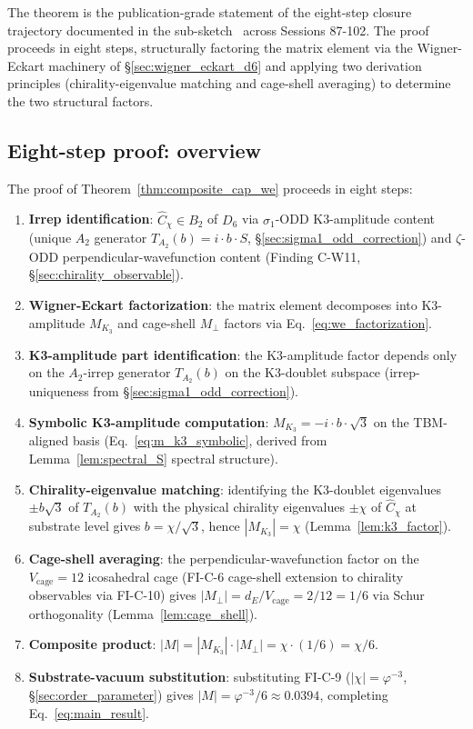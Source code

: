 \documentclass[11pt,letterpaper]{article}
\newcommand{\phig}{\varphi}
\newcommand{\Kthree}{\ensuremath{K_3}}
\newcommand{\Cchi}{\hat{C}_\chi}
\newcommand{\Dsix}{D_6}
\begin{document}
The theorem is the publication-grade statement of the eight-step closure trajectory documented in the sub-sketch~\cite{abshier_capotauro_subclaim_c_sketch} across Sessions 87-102. The proof proceeds in eight steps, structurally factoring the matrix element via the Wigner-Eckart machinery of \S\ref{sec:wigner_eckart_d6} and applying two derivation principles (chirality-eigenvalue matching and cage-shell averaging) to determine the two structural factors.

\subsection{Eight-step proof: overview}\label{sec:proof_overview}

The proof of Theorem~\ref{thm:composite_cap_we} proceeds in eight steps:

\begin{enumerate}\setlength\itemsep{0.2em}
    \item[\textbf{S1}] \textbf{Irrep identification}: $\Cchi \in B_2$ of $\Dsix$ via $\sigma_1$-ODD K3-amplitude content (unique $A_2$ generator $T_{A_2}(b) = i \cdot b \cdot S$, \S\ref{sec:sigma1_odd_correction}) and $\zeta$-ODD perpendicular-wavefunction content (Finding C-W11, \S\ref{sec:chirality_observable}).
    \item[\textbf{S2}] \textbf{Wigner-Eckart factorization}: the matrix element decomposes into K3-amplitude $M_{\Kthree}$ and cage-shell $M_\perp$ factors via Eq.~\eqref{eq:we_factorization}.
    \item[\textbf{S3}] \textbf{K3-amplitude part identification}: the K3-amplitude factor depends only on the $A_2$-irrep generator $T_{A_2}(b)$ on the K3-doublet subspace (irrep-uniqueness from \S\ref{sec:sigma1_odd_correction}).
    \item[\textbf{S4}] \textbf{Symbolic K3-amplitude computation}: $M_{\Kthree} = -i \cdot b \cdot \sqrt{3}$ on the TBM-aligned basis (Eq.~\eqref{eq:m_k3_symbolic}, derived from Lemma~\ref{lem:spectral_S} spectral structure).
    \item[\textbf{S5}] \textbf{Chirality-eigenvalue matching}: identifying the K3-doublet eigenvalues $\pm b\sqrt{3}$ of $T_{A_2}(b)$ with the physical chirality eigenvalues $\pm \chi$ of $\Cchi$ at substrate level gives $b = \chi/\sqrt{3}$, hence $|M_{\Kthree}| = \chi$ (Lemma~\ref{lem:k3_factor}).
    \item[\textbf{S6}] \textbf{Cage-shell averaging}: the perpendicular-wavefunction factor on the $V_\text{cage} = 12$ icosahedral cage (FI-C-6 cage-shell extension to chirality observables via FI-C-10) gives $|M_\perp| = d_E/V_\text{cage} = 2/12 = 1/6$ via Schur orthogonality (Lemma~\ref{lem:cage_shell}).
    \item[\textbf{S7}] \textbf{Composite product}: $|M| = |M_{\Kthree}| \cdot |M_\perp| = \chi \cdot (1/6) = \chi/6$.
    \item[\textbf{S8}] \textbf{Substrate-vacuum substitution}: substituting FI-C-9 ($|\chi| = \phig^{-3}$, \S\ref{sec:order_parameter}) gives $|M| = \phig^{-3}/6 \approx 0.0394$, completing Eq.~\eqref{eq:main_result}.
\end{enumerate}
\end{document}
